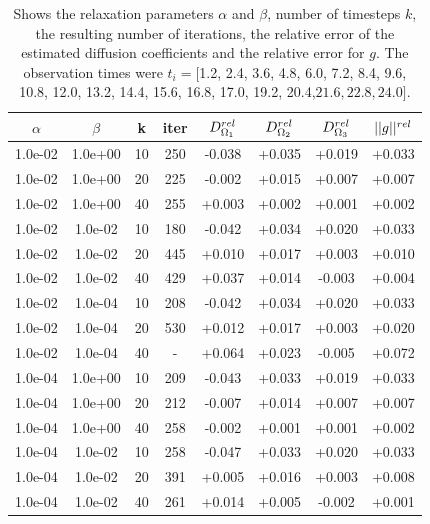 \documentclass[12pt,a4paper]{article}
\begin{document}
\begin{table}
\centering
\caption{ Shows the relaxation parameters $\alpha$ and $\beta$, number of timesteps $k$, the resulting number of iterations, the relative error of the estimated diffusion coefficients and the relative error for $g$. The observation times were $t_i = [ $1.2, 2.4, 3.6, 4.8, 6.0, 7.2, 8.4, 9.6, 10.8, 12.0, 13.2, 14.4, 15.6, 16.8, 17.0, 19.2, 20.4,$ 21.6, 22.8, 24.0 ]$.}
\begin{tabular}{*{8}c}
$\alpha$ & $\beta$ & k & iter & $ D_{\Omega_1}\sp{rel}$ & $ D_{\Omega_2}\sp{rel}$ & $D_{\Omega_3}\sp{rel} $ & $||g||\sp{rel} $ \\
\hline

 1.0e-02 	 & 1.0e+00 	 & 10 & 250 	 & -0.038 & +0.035 & +0.019 & +0.033 \\ 
 1.0e-02 	 & 1.0e+00 	 & 20 & 225 	 & -0.002 & +0.015 & +0.007 & +0.007 \\ 
 1.0e-02 	 & 1.0e+00 	 & 40 & 255 	 & +0.003 & +0.002 & +0.001 & +0.002 \\ 

 1.0e-02 	 & 1.0e-02 	 & 10 & 180 	 & -0.042 & +0.034 & +0.020 & +0.033 \\ 
 1.0e-02 	 & 1.0e-02 	 & 20 & 445 	 & +0.010 & +0.017 & +0.003 & +0.010 \\ 
  1.0e-02 	 & 1.0e-02 	 & 40 & 429 	 & +0.037 & +0.014 & -0.003 & +0.004 \\ 
  
 1.0e-02 	 & 1.0e-04 	 & 10 & 208 	 & -0.042 & +0.034 & +0.020 & +0.033 \\ 
  1.0e-02 	 & 1.0e-04 	 & 20 & 530 	 & +0.012 & +0.017 & +0.003 & +0.020 \\ 
 1.0e-02 	 & 1.0e-04 	 & 40 & - 	 & +0.064 & +0.023 & -0.005 & +0.072 \\ 
 
 1.0e-04 	 & 1.0e+00 	 & 10 & 209 	 & -0.043 & +0.033 & +0.019 & +0.033 \\ 
 1.0e-04 	 & 1.0e+00 	 & 20 & 212 	 & -0.007 & +0.014 & +0.007 & +0.007 \\ 
 1.0e-04 	 & 1.0e+00 	 & 40 & 258 	 & -0.002 & +0.001 & +0.001 & +0.002 \\ 
 
 1.0e-04 	 & 1.0e-02 	 & 10 & 258 	 & -0.047 & +0.033 & +0.020 & +0.033 \\ 
 1.0e-04 	 & 1.0e-02 	 & 20 & 391 	 & +0.005 & +0.016 & +0.003 & +0.008 \\ 
 1.0e-04 	 & 1.0e-02 	 & 40 & 261 	 & +0.014 & +0.005 & -0.002 & +0.001 \\ 
 

\end{tabular}
\end{table}
\end{document}
